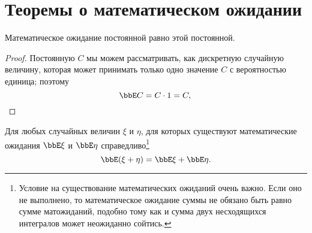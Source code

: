 \section{Теоремы о математическом ожидании}
\begin{thm}\label{ch31.3thm1}
Математическое ожидание постоянной равно этой постоянной.
\end{thm}
\begin{proof}
Постоянную $C$ мы можем рассматривать, как дискретную случайную величину, которая может принимать только одно значение $C$ с вероятностью единица; поэтому
\begin{equation*}
\bbE C = C\cdot1=C, \qedhere
\end{equation*}
\end{proof}
\begin{thm}\label{ch31.2t1}
Для любых случайных величин $\xi$ и $\eta$, для которых существуют математические ожидания $\bbE\xi$ и $\bbE\eta$ справедливо\footnote{Условие на существование математических ожиданий очень важно. Если оно не выполнено, то математическое ожидание суммы не обязано быть равно сумме матожиданий, подобно тому как и сумма двух несходящихся интегралов может неожиданно сойтись.}
\begin{equation}
\bbE(\xi+\eta) = \bbE\xi+\bbE\eta.
\end{equation}
\end{thm}
